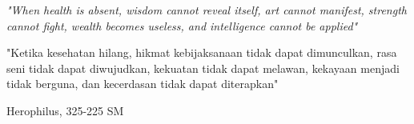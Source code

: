 \frontmatter
 
\cleardoublepage{}

{}
\cleardoublepage
\pagestyle{plain}

 
\cleardoublepage{}
%

\cleardoublepage{}
%

\cleardoublepage{}
\newpage{}

\pagestyle{fancy}

\tableofcontents
\clearpage{}
\listoffigures
\clearpage{}
\listoftables
\cleardoublepage{}
\newpage{}\thispagestyle{empty}
\epigraph{\emph{"When health is absent, wisdom cannot reveal itself, art cannot manifest, strength cannot fight, wealth becomes useless, and intelligence cannot be applied"}

"Ketika kesehatan hilang, hikmat kebijaksanaan tidak dapat dimunculkan, rasa seni tidak dapat diwujudkan, kekuatan tidak dapat melawan, kekayaan menjadi tidak berguna, dan kecerdasan tidak dapat diterapkan"}{Herophilus, 325-225 SM}
\clearpage{} 